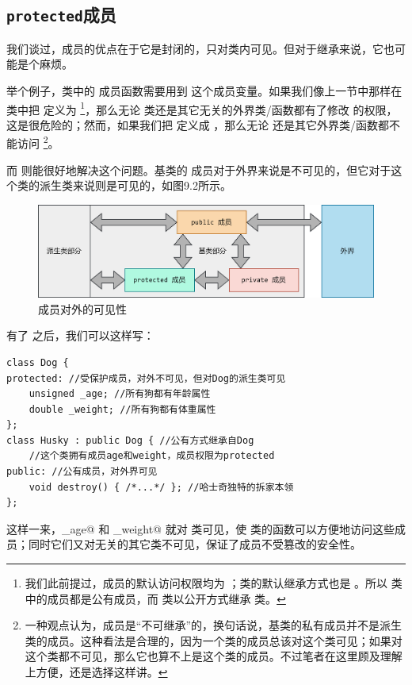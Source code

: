 \subsection*{\texttt{protected}成员}
我们谈过，\lstinline@private@ 成员的优点在于它是封闭的，只对类内可见。但对于继承来说，它也可能是个麻烦。\par
举个例子，\lstinline@Husky@ 类中的 \lstinline@destory@ 成员函数需要用到 \lstinline@weight@ 这个成员变量。如果我们像上一节中那样在 \lstinline@Dog@ 类中把 \lstinline@weight@ 定义为 \lstinline@public@\footnote{我们此前提过，\lstinline@struct@ 成员的默认访问权限均为 \lstinline@public@；\lstinline@struct@ 类的默认继承方式也是 \lstinline@public@。所以 \lstinline@Dog@ 类中的成员都是公有成员，而 \lstinline@Husky@ 类以公开方式继承 \lstinline@Dog@ 类。}，那么无论 \lstinline@Husky@ 类还是其它无关的外界类/函数都有了修改 \lstinline@weight@ 的权限，这是很危险的；然而，如果我们把 \lstinline@weight@ 定义成 \lstinline@private@，那么无论 \lstinline@Husky@ 还是其它外界类/函数都不能访问 \lstinline@weight@\footnote{一种观点认为，\lstinline@private@ 成员是``不可继承''的，换句话说，基类的私有成员并不是派生类的成员。这种看法是合理的，因为一个类的成员总该对这个类可见；如果对这个类都不可见，那么它也算不上是这个类的成员。不过笔者在这里顾及理解上方便，还是选择这样讲。}。\par
而 \lstinline@protected@ 则能很好地解决这个问题。基类的 \lstinline@protected@ 成员对于外界来说是不可见的，但它对于这个类的派生类来说则是可见的，如图9.2所示。\par
\begin{figure}[htbp]
    \centering
    \includegraphics[width=\textwidth]{../images/generalized_parts/09_protected_members.png}
    \caption{\lstinline@protected@ 成员对外的可见性}
\end{figure}
有了 \lstinline@protected@ 之后，我们可以这样写：
\begin{lstlisting}
class Dog {
protected: //受保护成员，对外不可见，但对Dog的派生类可见
    unsigned _age; //所有狗都有年龄属性
    double _weight; //所有狗都有体重属性
};
class Husky : public Dog { //公有方式继承自Dog
    //这个类拥有成员age和weight，成员权限为protected
public: //公有成员，对外界可见
    void destroy() { /*...*/ }; //哈士奇独特的拆家本领
};
\end{lstlisting}\par
这样一来，\lstinline@_age@ 和 \lstinline@_weight@ 就对 \lstinline@Husky@ 类可见，使 \lstinline@Husky@ 类的函数可以方便地访问这些成员；同时它们又对无关的其它类不可见，保证了成员不受篡改的安全性。\par
